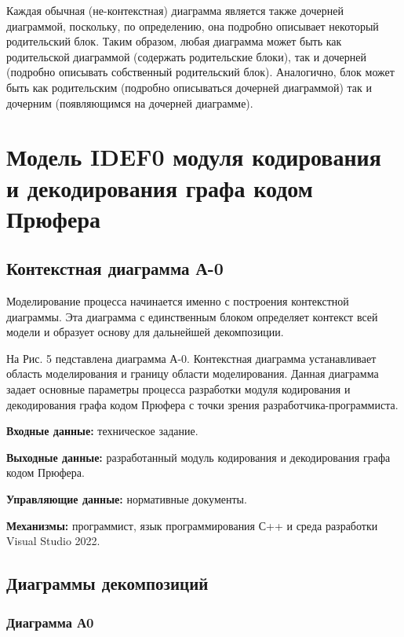 \documentclass[a4paper, final]{article}
\begin{document}
Каждая обычная (не-контекстная) диаграмма является также
дочерней диаграммой, поскольку, по определению, она подробно описывает некоторый родительский блок. Таким образом, любая диаграмма может быть как родительской диаграммой (содержать родительские блоки), так и дочерней (подробно описывать собственный родительский блок). Аналогично, блок может быть как родительским (подробно описываться дочерней диаграммой) так и дочерним (появляющимся на дочерней диаграмме). 

\newpage
\section{Модель IDEF0 модуля кодирования и декодирования графа кодом Прюфера}
\subsection{Контекстная диаграмма А-0}

Моделирование процесса начинается именно с построения контекстной диаграммы. Эта диаграмма с единственным блоком определяет
контекст всей модели и образует основу для дальнейшей декомпозиции. 
\par На Рис. 5 педставлена диаграмма А-0. Контекстная диаграмма устанавливает область моделирования и границу 
области моделирования. Данная диаграмма задает основные параметры процесса разработки модуля кодирования и декодирования графа
кодом Прюфера с точки зрения разработчика-программиста. 

\par {\bf Входные данные:} техническое задание.

\par {\bf Выходные данные:} разработанный модуль кодирования и декодирования графа кодом Прюфера.

\par {\bf Управляющие данные:} нормативные документы.

\par {\bf Механизмы:} программист, язык программирования С++ и среда разработки Visual Studio 2022. 

\newpage
\hypertarget{img:A-0}{}



\subsection{Диаграммы декомпозиций}
\subsubsection{Диаграмма А0}
\end{document}
